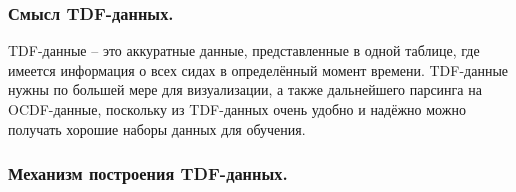 \subsubsection{ \standartTitleFont
  Смысл TDF-данных.
} \label{subsubsec:CreateTDFTarget}

{\standartFont

  \par TDF-данные {--} это аккуратные данные, представленные в одной таблице, где имеется информация о всех сидах в определённый момент времени. TDF-данные нужны по большей мере для визуализации, а также дальнейшего парсинга на OCDF-данные, поскольку из TDF-данных очень удобно и надёжно можно получать хорошие наборы данных для обучения.  

  \par
}

\subsubsection{ \standartTitleFont
  Механизм построения TDF-данных.
} \label{subsubsec:CreateTDFHow}

